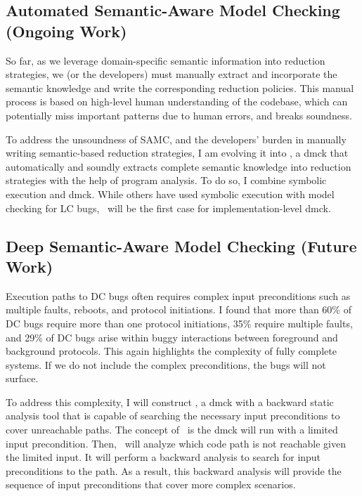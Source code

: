 \documentclass[11pt]{article}
\begin{document}

\subsection{Automated Semantic-Aware Model Checking (Ongoing Work)} 

So far, as we leverage domain-specific semantic information into reduction
strategies, we (or the developers) must manually extract and incorporate the
semantic knowledge and write the corresponding reduction policies. This manual
process is based on high-level human understanding of the codebase, which can
potentially miss important patterns due to human errors, and breaks soundness.

To address the unsoundness of SAMC, and the developers' burden in manually
writing semantic-based reduction strategies, I am evolving it into \autocheck,
a dmck that automatically and soundly extracts complete semantic knowledge into
reduction strategies with the help of program analysis.
%
To do so, I combine symbolic execution and dmck. While others have used symbolic
execution with model checking for LC bugs, \autocheck\ will be the first case for
implementation-level dmck. 

\subsection{Deep Semantic-Aware Model Checking (Future Work)}

Execution paths to DC bugs often requires complex input preconditions such as
multiple faults, reboots, and protocol initiations. I found that more than 60\%
of DC bugs require more than one protocol initiations, 35\% require multiple
faults, and 29\% of DC bugs arise within buggy interactions between foreground
and background protocols.  This again highlights the complexity of fully
complete systems. If we do not include the complex preconditions, the bugs will
not surface.

To address this complexity, I will construct \deepcheck, a dmck with a backward
static analysis tool that is capable of searching the necessary input
preconditions to cover unreachable paths. The concept of \deepcheck\ is the dmck
will run with a limited input precondition. Then, \deepcheck\ will analyze which
code path is not reachable given the limited input. It will perform a backward
analysis to search for input preconditions to the path. As a result, this
backward analysis will provide the sequence of input preconditions that cover
more complex scenarios.


\end{document}
